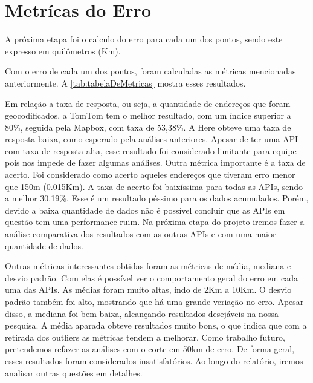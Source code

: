 \section{Metrícas do Erro}
A próxima etapa foi o calculo do erro para cada um dos pontos, sendo este expresso em quilômetros (Km).

Com o erro de cada um dos pontos, foram calculadas as métricas mencionadas anteriormente. A \ref{tab:tabelaDeMetricas} mostra esses resultados.

Em relação a taxa de resposta, ou seja, a quantidade de endereços que foram geocodificados, a TomTom tem o melhor resultado, com um índice superior a 80\%, seguida pela Mapbox, com taxa de 53,38\%. A Here obteve uma taxa de resposta baixa, como esperado pela análises anteriores. Apesar de ter uma API com taxa de resposta alta, esse resultado foi considerado limitante para equipe pois nos impede de fazer algumas análises.
Outra métrica importante é a taxa de acerto. Foi considerado como acerto aqueles endereços que tiveram erro menor que 150m (0.015Km). A taxa de acerto foi baixíssima para todas as APIs, sendo a melhor 30.19\%. Esse é um resultado péssimo para os dados acumulados. Porém, devido a baixa quantidade de dados não é possível concluir que as APIs em questão tem uma performance ruim. Na próxima etapa do projeto iremos fazer a análise comparativa dos resultados com as outras APIs e com uma maior quantidade de dados. 

Outras métricas interessantes obtidas foram as métricas de média, mediana e desvio padrão. Com elas é possível ver o comportamento geral do erro em cada uma das APIs. As médias foram muito altas, indo de 2Km a 10Km. O desvio padrão também foi alto, mostrando que há uma grande veriação no erro. Apesar disso, a mediana foi bem baixa, alcançando resultados desejáveis na nossa pesquisa. A média aparada obteve resultados muito bons, o que indica que com a retirada dos outliers as métricas tendem a melhorar. Como trabalho futuro, pretendemos refazer as análises com o corte em 50km de erro. De forma geral, esses resultados foram considerados insatisfatórios. Ao longo do relatório, iremos analisar outras questões em detalhes.

